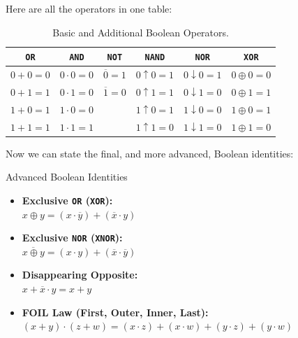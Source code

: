 Here are all the operators in one table:

\begin{table}[h!]
    \begin{center}
    \renewcommand{\arraystretch}{1.5} %
    \begin{tabular}{c|c|c|c|c|c}
    \texttt{OR} & \texttt{AND} & \texttt{NOT} & \texttt{NAND} & \texttt{NOR} & \texttt{XOR} \\
    \hline %
    $0 + 0 = 0$ & $0 \cdot 0 = 0$ & $\overline{0} = 1$ & $0 \uparrow 0 = 1$ & $0 \downarrow 0 = 1$ & $0 \oplus 0 = 0$ \\
    $0 + 1 = 1$ & $0 \cdot 1 = 0$ & $\overline{1} = 0$ & $0 \uparrow 1 = 1$ & $0 \downarrow 1 = 0$ & $0 \oplus 1 = 1$ \\
    $1 + 0 = 1$ & $1 \cdot 0 = 0$ & & $1 \uparrow 0 = 1$ & $1 \downarrow 0 = 0$ & $1 \oplus 0 = 1$ \\
    $1 + 1 = 1$ & $1 \cdot 1 = 1$ & & $1 \uparrow 1 = 0$ & $1 \downarrow 1 = 0$ & $1 \oplus 1 = 0$ \\
    \end{tabular}
    \end{center}
    \caption{Basic and Additional Boolean Operators.}
    \label{tab:mergedops}
\end{table}


Now we can state the final, and more advanced, Boolean identities:

\begin{custombox}{Advanced Boolean Identities}
\begin{itemize}
    \item \textbf{Exclusive \texttt{OR} (\texttt{XOR}):} \\
    \hspace*{15pt} $x \oplus y = (x \cdot \overline{y}) + (\overline{x} \cdot y)$
    
    \item \textbf{Exclusive \texttt{NOR} (\texttt{XNOR}):} \\
    \hspace*{15pt} $\overline{x \oplus y} = (x \cdot y) + (\overline{x} \cdot \overline{y})$
    
    \item \textbf{Disappearing Opposite:} \\
    \hspace*{15pt} $x + \overline{x} \cdot y = x + y$
    
    \item \textbf{FOIL Law (First, Outer, Inner, Last):} \\
    \hspace*{15pt} $(x + y) \cdot (z + w) = (x \cdot z) + (x \cdot w) + (y \cdot z) + (y \cdot w)$
\end{itemize}
\end{custombox}

